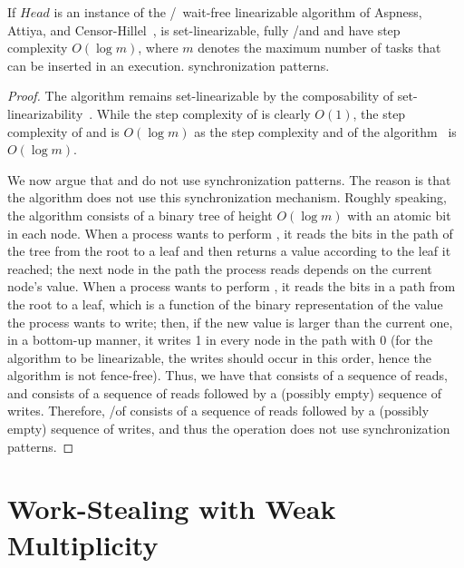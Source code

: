 \begin{theorem}\label{theo-wf-log}
If $Head$ is an instance of the \R/\W\ wait-free linearizable \MaxReg algorithm of Aspness, Attiya, and Censor-Hillel~\cite{DBLP_journals_jacm_AspnesAC12}, \WFWSM is set-linearizable, fully \R/\W and \Take and \Steal have step complexity $O(\log m)$, where $m$ denotes the maximum number of tasks that can be inserted in an execution.   \RAW synchronization patterns.
\end{theorem}

\begin{proof}
The algorithm remains set-linearizable by the composability of set-linearizability~\cite{DBLP_journals_jacm_CastanedaRR18}.  While the step complexity of \Put is clearly $O(1)$, the step complexity of \Take and \Steal is $O(\log m)$ as the step complexity \MaxR and \MaxW of the \MaxReg algorithm~\cite{DBLP_journals_jacm_AspnesAC12} is $O(\log m)$.

We now argue that \Take and \Steal do not use \RAW synchronization patterns.  The reason is that the \MaxReg algorithm does not use this synchronization mechanism.  Roughly speaking, the algorithm consists of a binary tree of height $O(\log m)$ with an atomic bit in each node.  When a process wants to perform \MaxR, it reads the bits in the path of the tree from the root to a leaf and then returns a value according to the leaf it reached; the next node in the path the process reads depends on the current node's value.  When a process wants to perform \MaxW, it reads the bits in a path from the root to a leaf, which is a function of the binary representation of the value the process wants to write; then, if the new value is larger than the current one, in a bottom-up manner, it writes 1 in every node in the path with 0 (for the algorithm to be linearizable, the writes should occur in this order, hence the algorithm is not fence-free).  Thus, we have that \MaxR consists of a sequence of reads, and \MaxW consists of a sequence of reads followed by a (possibly empty) sequence of writes.  Therefore, \Take/\Steal of \WFWSM consists of a sequence of reads followed by a (possibly empty) sequence of writes, and thus the operation does not use \RAW synchronization patterns.
\end{proof}

\section{\label{sec-ws-nc-mult}Work-Stealing with Weak Multiplicity}

